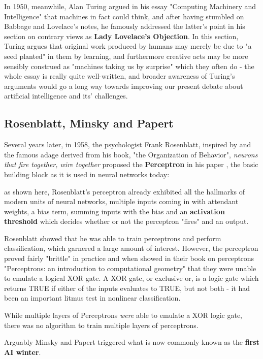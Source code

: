 \pagebreak

In 1950, meanwhile, Alan Turing argued in his essay "Computing Machinery and Intelligence" that machines in fact could think, and after having stumbled on Babbage and Lovelace's notes, he famously addressed the latter's point in his section on contrary views as \textbf{Lady Lovelace's Objection}. In this section, Turing argues that original work produced by humans may merely be due to "a seed planted" in them by learning, and furthermore creative acts may be more sensibly construed as "machines taking us by surprise" which they often do \cite{turing1950mind} - the whole essay is really quite well-written, and broader awareness of Turing's arguments would go a long way towards improving our present debate about artificial intelligence and its' challenges.

\subsection{Rosenblatt, Minsky and Papert}

Several years later, in 1958, the psychologist Frank Rosenblatt, inspired by \cite{hebb1949organisation} and the famous adage derived from his book, "the Organization of Behavior", \textit{neurons that fire together, wire together} proposed the \textbf{Perceptron} in his paper \cite{rosenblatt1958perceptron}, the basic building block as it is used in neural networks today:


as shown here, Rosenblatt's perceptron already exhibited all the hallmarks of modern units of neural networks, multiple inputs coming in with attendant weights, a bias term, summing inputs with the bias and an \textbf{activation threshold} which decides whether or not the perceptron "fires" and an output.

Rosenblatt showed that he was able to train perceptrons and perform classification, which garnered a large amount of interest. However, the perceptron proved fairly "brittle" in practice and when \cite{minsky} showed in their book on perceptrons "Perceptrons: an introduction to computational geometry" that they were unable to emulate a logical XOR gate. A XOR gate, or exclusive or, is a logic gate which returns TRUE if either of the inputs evaluates to TRUE, but not both - it had been an important litmus test in nonlinear classification. 

While multiple layers of Perceptrons \textit{were} able to emulate a XOR logic gate, there was no algorithm to train multiple layers of perceptrons.

Arguably Minsky and Papert triggered what is now commonly known as the \textbf{first \ac{AI} winter}.
